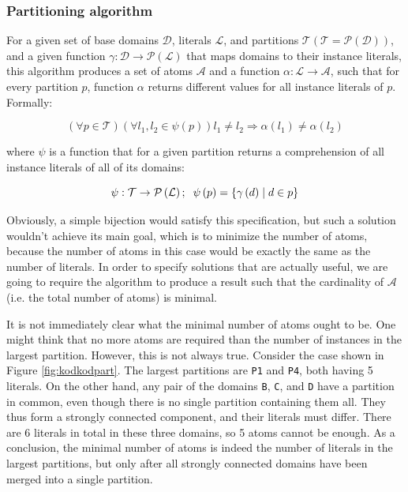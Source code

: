\documentclass[11pt,twoside,a4paper]{book}
\begin{document}
\subsubsection{Partitioning algorithm}
For a given set of base domains $\mathcal{D}$, literals $\mathcal{L}$, and
partitions $\mathcal{T} \left( \mathcal{T} = \mathcal{P}\left( \mathcal{D} \right) \right)$, and a given function $\gamma : \mathcal{D} \rightarrow \mathcal{P}\left( \mathcal{L} \right)$ that maps domains to their instance
literals, this algorithm produces a set of atoms $\mathcal{A}$ and a function $\alpha : \mathcal{L} \rightarrow \mathcal{A}$, such that for every partition
$p$, function $\alpha$ returns different values for all instance literals of
$p$. Formally:

$$\left(\forall p \in \mathcal{T}\right)\left(\forall l_1,l_2 \in
\psi\left(p\right)\right) l_1 \neq l_2 \Longrightarrow \alpha
\left(l_1\right)\neq \alpha \left(l_2\right)$$


where $\psi$ is a function that for a given partition returns a comprehension of
all instance literals of all of its domains:


$$\psi : \mathcal{T}\rightarrow \mathcal{P} \left(\mathcal{L}\right);
\hspace{2mm} \psi\left(p\right) = \{\gamma\left(d\right)\mid d \in p\}$$

Obviously, a simple bijection would satisfy this specification, but such a solution
wouldn't achieve its main goal, which is to minimize the number of atoms, because
the number of atoms in this case would be exactly the same as the number of literals.
In order to specify solutions that are actually useful, we are going to require the
algorithm to produce a result such that the cardinality of $\mathcal{A}$ (i.e.
the total number of atoms) is minimal.

It is not immediately clear what the minimal number of atoms ought to be. One
might think that no more atoms are required than the number of instances in the
largest partition. However, this is not always true. Consider the case shown in
Figure \ref{fig:kodkodpart}. The largest partitions are \verb|P1| and \verb|P4|,
both having 5 literals. On the other hand, any pair of the domains \verb|B|, \verb|C|, and
\verb|D| have a partition in common, even though there is no single partition
containing them all. They thus form a strongly connected component, and their literals must differ. There are 6 literals in total in
these three domains, so 5 atoms cannot be enough. As a conclusion, the minimal
number of atoms is indeed the number of literals in the largest partitions, but only
after all strongly connected domains have been merged into a single partition.
\end{document}
